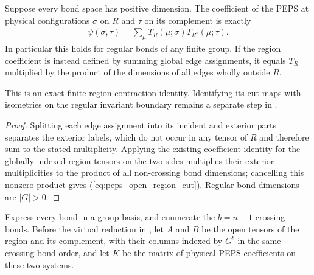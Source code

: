\begin{lemma}%
    \label{thm:peps_open_region_cut}
    \leanok
    Suppose every bond space has positive dimension. The coefficient
    of the PEPS at physical configurations $\sigma$ on $R$ and $\tau$
    on its complement is exactly
    \begin{align}
        \psi(\sigma,\tau)=\sum_\mu T_R(\mu;\sigma)T_{R^c}(\mu;\tau).
        \label{eq:peps_open_region_cut}
    \end{align}
    In particular this holds for regular bonds of any finite group.
    If the region coefficient is instead defined by summing global
    edge assignments, it equals $T_R$ multiplied by the product of
    the dimensions of all edges wholly outside $R$.

    This is an exact finite-region contraction identity. Identifying
    its cut maps with isometries on the regular invariant boundary
    remains a separate step in \cite[Theorem~6.9]{Schuch2010PEPS}.
\end{lemma}
\begin{proof}\leanok
    Splitting each edge assignment into its incident and exterior parts separates
    the exterior labels, which do not occur in any tensor of $R$ and therefore sum
    to the stated multiplicity. Applying the existing coefficient
    identity for the globally indexed region tensors on the two sides multiplies
    their exterior multiplicities to the product of all
    non-crossing bond dimensions; cancelling this nonzero product
    gives (\ref{eq:peps_open_region_cut}). Regular bond dimensions are $|G|>0$.
\end{proof}

\begin{definition}%
    \label{def:peps_regular_physical_cut}
    \leanok
    Express every bond in a group basis, and enumerate the $b=n+1$
    crossing bonds. Before the virtual reduction in
    \cite[Proof of Theorem~6.9]{Schuch2010PEPS}, let $A$ and $B$ be the open tensors of the
    region and its complement, with their columns indexed by $G^b$ in
    the same crossing-bond order, and let $K$ be the matrix of physical
    PEPS coefficients on these two systems.
\end{definition}

